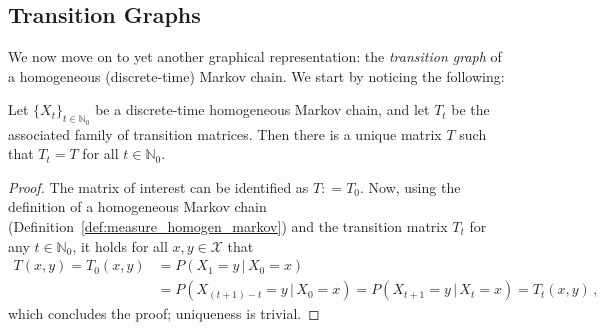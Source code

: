 \documentclass[graybox]{svmult}
\newcommand{\nats}{\mathbb{N}}
\newcommand{\natswith}{\nats_{0}}
\newcommand{\states}{\mathcal{X}}
\newcommand{\coloneqq}{:\!=}
\begin{document}
\subsection{Transition Graphs}\label{sec:trans_graph}

We now move on to yet another graphical representation: the \emph{transition graph} of a homogeneous (discrete-time) Markov chain. We start by noticing the following:
\begin{proposition}
Let $\{X_t\}_{t\in\natswith}$ be a discrete-time homogeneous Markov chain, and let $T_t$ be the associated family of transition matrices. Then there is a unique matrix $T$ such that $T_t=T$ for all $t\in\natswith$.
\end{proposition}
\begin{proof}
The matrix of interest can be identified as $T\coloneqq T_0$. Now, using the definition of a homogeneous Markov chain (Definition~\ref{def:measure_homogen_markov}) and the transition matrix $T_t$ for any $t\in\natswith$, it holds for all $x,y\in\states$ that
\begin{align*}
T(x,y) = T_0(x,y) &= P(X_1=y\,\vert\,X_0=x) \\
 &= P(X_{(t+1)-t}=y\,\vert\,X_0=x)=P(X_{t+1}=y\,\vert\,X_t=x)=T_t(x,y)\,,
\end{align*}
which concludes the proof; uniqueness is trivial.
\end{proof}
\end{document}
